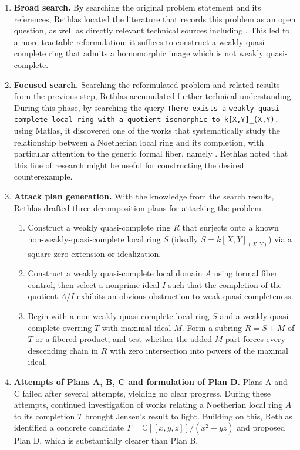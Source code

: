 \documentclass[]{pkuai4m}
\theoremstyle{plain}
\theoremstyle{definition}
\begin{document}
\begin{enumerate}[leftmargin=*]
    \item \textbf{Broad search.} By searching the original problem statement and its references, Rethlas located the literature that records this problem as an open question, as well as directly relevant technical sources including \cite{cahen2014open, farley2016quasi}. This led to a more tractable reformulation: it suffices to construct a weakly quasi-complete ring that admits a homomorphic image which is not weakly quasi-complete.
    \item \textbf{Focused search.} Searching the reformulated problem and related results from the previous step, Rethlas accumulated further technical understanding. During this phase, by searching the query \verb`There exists a` \verb`weakly quasi-complete local ring with a quotient isomorphic to k[X,Y]_(X,Y).` using Matlas, it discovered one of the works that systematically study the relationship between a Noetherian local ring and its completion, with particular attention to the generic formal fiber, namely \cite{fleming2019completely}. Rethlas noted that this line of research might be useful for constructing the desired counterexample.
    \item \textbf{Attack plan generation.} With the knowledge from the search results, Rethlas drafted three decomposition plans for attacking the problem.
    \begin{enumerate}[leftmargin=*]
        \item[A.] Construct a weakly quasi-complete ring \(R\) that surjects onto a known non-weakly-quasi-complete local ring \(S\) (ideally \(S = k[X,Y]_{(X,Y)}\)) via a square-zero extension or idealization.
        \item[B.] Construct a weakly quasi-complete local domain \(A\) using formal fiber control, then select a nonprime ideal \(I\) such that the completion of the quotient \(A/I\) exhibits an obvious obstruction to weak quasi-completeness.
        \item[C.] Begin with a non-weakly-quasi-complete local ring \(S\) and a weakly quasi-complete overring \(T\) with maximal ideal \(M\). Form a subring \(R = S + M\) of \(T\) or a fibered product, and test whether the added \(M\)-part forces every descending chain in \(R\) with zero intersection into powers of the maximal ideal.
    \end{enumerate}
    \item \textbf{Attempts of Plans A, B, C and formulation of Plan D.} Plans A and C failed after several attempts, yielding no clear progress. During these attempts, continued investigation of works relating a Noetherian local ring \(A\) to its completion \(T\) brought Jensen's result \cite{jensen2006completions} to light. Building on this, Rethlas identified a concrete candidate \(T = \mathbb{C}[[x,y,z]]/(x^2 - yz)\) and proposed Plan D, which is substantially clearer than Plan B.

\end{enumerate}
\end{document}
